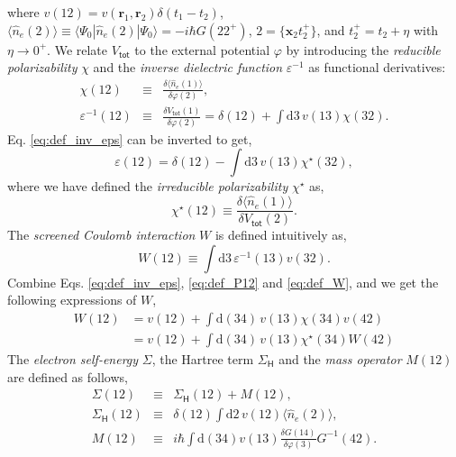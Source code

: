 \documentclass[11pt, oneside]{article}          %
\begin{document}
where $v(12) = v({\bm r}_1,{\bm r}_2) \delta(t_1 - t_2)$, $\langle \hat{n}_e (2) \rangle \equiv \langle \Psi_0 | \hat{n}_e(2) | \Psi_0 \rangle = -i \hbar G(22^{+})$, $2=\{ {\bm x}_2 t^{+}_2 \}$, and $t^{+}_2 = t_2 + \eta$ with $\eta \rightarrow 0^{+}$. We relate $V_{\mathsf{tot}}$ to the external potential $\varphi$ by introducing the \emph{reducible polarizability} $\chi$ and the \emph{inverse dielectric function} $\varepsilon^{-1}$ as functional derivatives:
\begin{eqnarray}
  \label{eq:def_inv_chi}
  \chi(12) & \equiv & \frac{\delta \langle \hat{n}_e(1) \rangle}{\delta \varphi(2)}, \\
  \label{eq:def_inv_eps}
  \varepsilon^{-1}(12) & \equiv & \frac{\delta V_{\mathsf{tot}}(1)}{\delta \varphi(2)} = \delta(12) + \int \mathrm{d}3 \, v(13) \chi(32).
\end{eqnarray}
Eq. \eqref{eq:def_inv_eps} can be inverted to get,
\begin{equation}
  \label{eq:def_eps}
  \varepsilon(12) = \delta(12) - \int \mathrm{d}3 \, v(13) \chi^{\star}(32),
\end{equation}
where we have defined the \emph{irreducible polarizability} $\chi^{\star}$ as,
\begin{equation}
  \label{eq:def_P12}
  \chi^{\star}(12) \equiv \frac{\delta \langle \hat{n}_e(1) \rangle}{\delta V_{\mathsf{tot}}(2)}.
\end{equation}
The \emph{screened Coulomb interaction} $W$ is defined intuitively as,
\begin{equation}
  \label{eq:def_W}
  W(12) \equiv \int \mathrm{d} 3 \, \varepsilon^{-1}(13) v(32).
\end{equation}
Combine Eqs. \eqref{eq:def_inv_eps}, \eqref{eq:def_P12} and \eqref{eq:def_W}, and we get the following expressions of $W$,
\begin{equation}
  \label{eq:W_v_chi}
  \begin{aligned}
    W(12) & = v(12) + \int \mathrm{d} (34) \, v(13) \chi(34) v(42) \\
    & = v(12) + \int \mathrm{d} (34) \, v(13) \chi^{\star}(34) W(42)
  \end{aligned}
\end{equation}
The \emph{electron self-energy} $\Sigma$, the Hartree term $\Sigma_{\mathsf{H}}$ and the \emph{mass operator} $M(12)$ are defined as follows,
\begin{eqnarray}
  \label{eq:def_Sigma}
  \Sigma(12) & \equiv & \Sigma_{\mathsf{H}}(12) + M(12), \\
  \label{eq:def_Sigma_H}
  \Sigma_{\mathsf{H}} (12) & \equiv & \delta(12) \int \mathrm{d}2 \, v(12) \langle \hat{n}_e(2) \rangle, \\
  \label{eq:def_M}
  M(12) & \equiv & i \hbar \int \mathrm{d}(34) v(13) \frac{\delta G(14)}{\delta \varphi(3)} G^{-1}(42).
\end{eqnarray}
\end{document}
